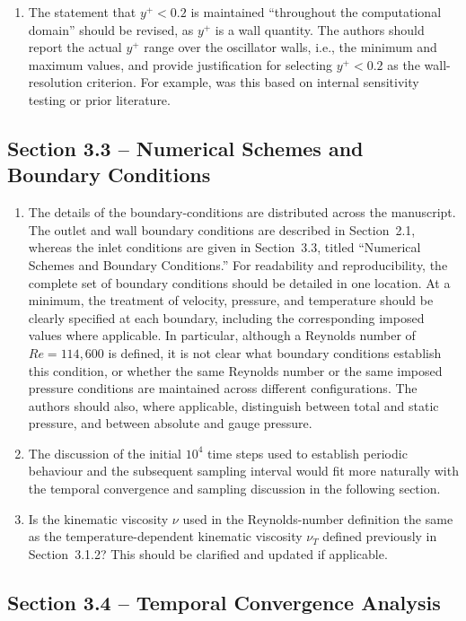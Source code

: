 \documentclass[11pt]{article}
\begin{document}
	\begin{enumerate}
		\item The statement that $y^+<0.2$ is maintained ``throughout the computational domain'' should be revised, as $y^+$ is a wall quantity. The authors should report the actual $y^+$ range over the oscillator walls, i.e., the minimum and maximum values, and provide justification for selecting $y^+<0.2$ as the wall-resolution criterion. For example, was this based on internal sensitivity testing or prior literature.
	\end{enumerate}
	
	
	\subsection*{Section 3.3 -- Numerical Schemes and Boundary Conditions}
	
	\begin{enumerate}
		\item The details of the boundary-conditions are distributed across the manuscript. The outlet and wall boundary conditions are described in Section~2.1, whereas the inlet conditions are given in Section~3.3, titled ``Numerical Schemes and Boundary Conditions.'' For readability and reproducibility, the complete set of boundary conditions should be detailed in one location. At a minimum, the treatment of velocity, pressure, and temperature should be clearly specified at each boundary, including the corresponding imposed values where applicable. In particular, although a Reynolds number of $Re=114{,}600$ is defined, it is not clear what boundary conditions establish this condition, or whether the same Reynolds number or the same imposed pressure conditions are maintained across different configurations. The authors should also, where applicable, distinguish between total and static pressure, and between absolute and gauge pressure. 
		\item The discussion of the initial $10^4$ time steps used to establish periodic behaviour and the subsequent sampling interval would fit more naturally with the temporal convergence and sampling discussion in the following section.
		\item Is the kinematic viscosity $\nu$ used in the Reynolds-number definition the same as the temperature-dependent kinematic viscosity $\nu_T$ defined previously in Section~3.1.2? This should be clarified and updated if applicable.
	\end{enumerate}
	
	
	\subsection*{Section 3.4 -- Temporal Convergence Analysis}
	
\end{document}

